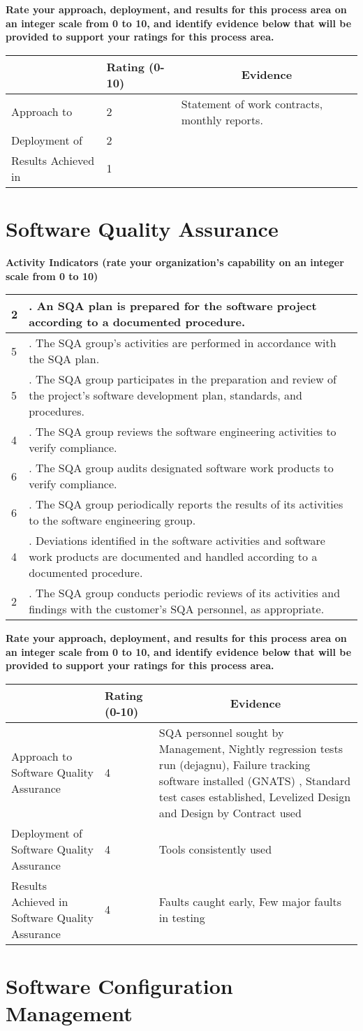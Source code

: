 \documentclass{article}
\newcommand{\KPAname}{}
\let\KPAsection=\section
\renewcommand{\section}[1]{\renewcommand{\KPAname}{#1}\KPAsection{#1}}
\newcounter{activity}		%
\newenvironment{KPAActivity}
{
    \setcounter{activity}{0} %
    {\bf Activity Indicators (rate your organization's capability
    on an integer scale from 0 to 10)} %
    \begin{center}
    \begin{tabular}{|p{0.5in}|p{6.0in}|} \hline %
}
{
    \end{tabular}
    \end{center}
}
\newcommand{\Activity}[2]
{
    \stepcounter{activity} #1 & \arabic{activity}. #2 \\ \hline
} %
\newenvironment{KPARate}
{
    {\bf Rate your approach, deployment, and results for
    this process area on an integer scale from 0 to 10, and 
    identify evidence below that will be provided to support your
    ratings for this process area.}
    \begin{center}
    \begin{tabular}{|p{1.0in}|p{0.5in}|p{5.0in}|} \hline
    & Rating (0-10) & \multicolumn{1}{c|}{Evidence} \\ \hline
}
{
    \end{tabular}
    \end{center}
}
\newcommand{\Approach}[2]{Approach to \KPAname & #1 & #2 \\ \hline}
\newcommand{\Deployment}[2]{Deployment of \KPAname & #1 & #2 \\ \hline}
\newcommand{\Results}[2]{Results Achieved in \KPAname & #1 & #2 \\
	\hline}
\begin{document}
\begin{KPARate}
\Approach{2}{Statement of work contracts, monthly reports.}
\Deployment{2}{}
\Results{1}{}
\end{KPARate}

\newpage
\section{Software Quality Assurance}

\begin{KPAActivity}
\Activity{2}{An SQA plan is prepared for the software project
according to a documented procedure.}
\Activity{5}{The SQA group's activities are performed in accordance
with the SQA plan.}
\Activity{5}{The SQA group participates in the preparation and review
of the project's software development plan, standards, and
procedures.}
\Activity{4}{The SQA group reviews the software engineering activities
to verify compliance.}
\Activity{6}{The SQA group audits designated software work products to
verify compliance.}
\Activity{6}{The SQA group periodically reports the results of its
activities to the software engineering group.}
\Activity{4}{Deviations identified in the software activities and
software work products are documented and handled according to a
documented procedure.}
\Activity{2}{The SQA group conducts periodic reviews of its activities
and findings with the customer's SQA personnel, as appropriate.}
\end{KPAActivity}

\begin{KPARate}
\Approach{4}{SQA personnel sought by Management, Nightly regression
             tests run (dejagnu), Failure tracking software installed
             (GNATS) , Standard test cases established, Levelized
             Design and Design by Contract used}
\Deployment{4}{Tools consistently used}
\Results{4}{Faults caught early, Few major faults in testing}
\end{KPARate}

\newpage
\section{Software Configuration Management}
\end{document}
